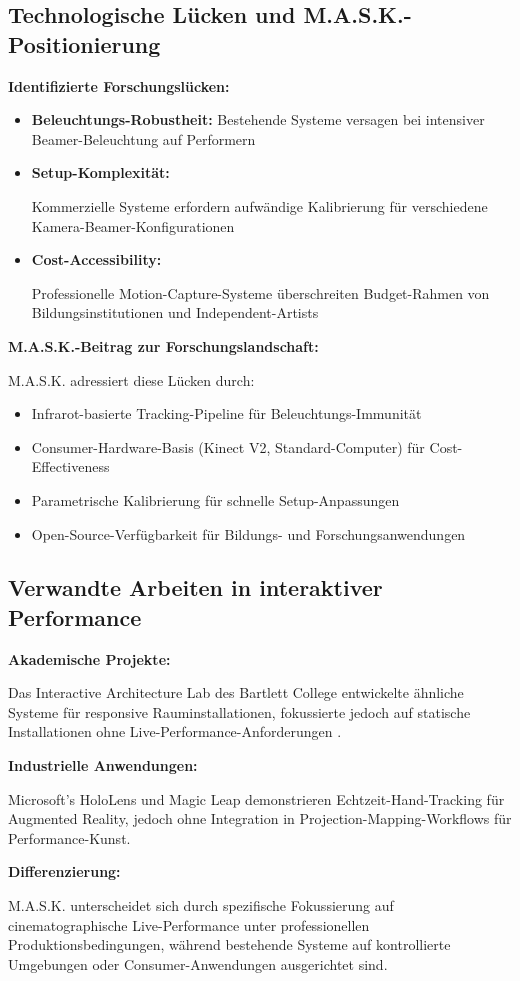 \subsection{Technologische Lücken und M.A.S.K.-Positionierung}

\textbf{Identifizierte Forschungslücken:}

\begin{itemize}
    \item \textbf{Beleuchtungs-Robustheit:} Bestehende Systeme versagen bei intensiver Beamer-Beleuchtung auf Performern
    \item \textbf{Setup-Komplexität:} \raggedright Kommerzielle Systeme erfordern aufwändige Kalibrierung für verschiedene Kamera-Beamer-Konfigurationen
    \item \textbf{Cost-Accessibility:} \raggedright Professionelle Motion-Capture-Systeme überschreiten Budget-Rahmen von Bildungsinstitutionen und Independent-Artists
\end{itemize}

\textbf{M.A.S.K.-Beitrag zur Forschungslandschaft:}

M.A.S.K. adressiert diese Lücken durch:
\begin{itemize}
    \item Infrarot-basierte Tracking-Pipeline für Beleuchtungs-Immunität
    \item Consumer-Hardware-Basis (Kinect V2, Standard-Computer) für Cost-Effectiveness
    \item Parametrische Kalibrierung für schnelle Setup-Anpassungen
    \item Open-Source-Verfügbarkeit für Bildungs- und Forschungsanwendungen
\end{itemize}

\subsection{Verwandte Arbeiten in interaktiver Performance}

\textbf{Akademische Projekte:}

\raggedright Das Interactive Architecture Lab des Bartlett College entwickelte ähnliche Systeme für responsive Rauminstallationen, fokussierte jedoch auf statische Installationen ohne Live-Performance-Anforderungen \cite{achten2011interactive}.

\textbf{Industrielle Anwendungen:}

\raggedright Microsoft's HoloLens und Magic Leap demonstrieren Echtzeit-Hand-Tracking für Augmented Reality, jedoch ohne Integration in Projection-Mapping-Workflows für Performance-Kunst.

\textbf{Differenzierung:}

\raggedright M.A.S.K. unterscheidet sich durch spezifische Fokussierung auf cinematographische Live-Performance unter professionellen Produktionsbedingungen, während bestehende Systeme auf kontrollierte Umgebungen oder Consumer-Anwendungen ausgerichtet sind.